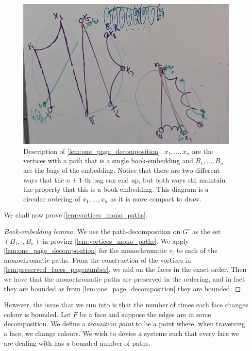 \begin{figure}
	\centering
	\includegraphics[width= 0.8 \textwidth]{figures/20240508_173516}
	\caption{Description of \cref{lem:one_page_decomposition}. \(x_1, \ldots, x_n\) are the vertices with a path that is a single book-embedding and \(B_1, \ldots, B_n\) are the bags of the embedding. Notice that there are two different ways that the \(n + 1\)-th bag can end up, but both ways stil maintain the property that this is a book-embedding. This diagram is a circular ordering of \(x_1, \ldots, x_n\) as it is more compact to draw.}\label{fig:preserving_pages}
\end{figure}


We shall now prove \cref{lem:vortices_mono_paths}.
\begin{proof}[Book-embedding lemma]
	We use the path-decomposition on \(G'\) as the set \((B_1, \cdot , B_n)\) in proving \cref{lem:vortices_mono_paths}. We apply \cref{lem:one_page_decomposition} for the monochromatic \(v_i\) to each of the monochromatic paths. From the construction of the vortices in \cref{lem:preserved_faces_pagenumber}, we add on the faces in the exact order. Then we have that the monochromatic paths are preserved in the ordering, and in fact they are bounded as from \cref{lem:one_page_decomposition} they are bounded.
\end{proof}

However, the issue that we run into is that the number of times each face changes colour is bounded. Let \(F\) be a face and suppose the edges are in some decomposition. We define a \textit{transition point} to be a point where, when traversing a face, we change colours. We wish to devise a systems such that every face we are dealing with has a bounded number of paths.


